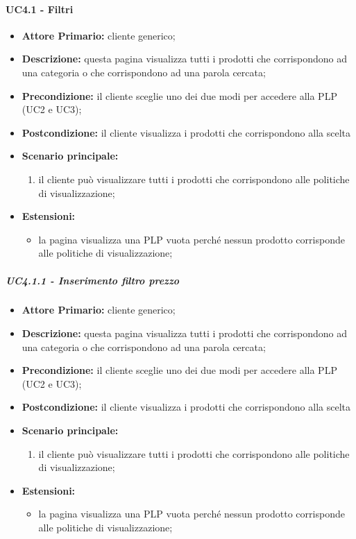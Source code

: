 \paragraph{UC4.1 - Filtri}
\begin{itemize}
    \item \textbf{Attore Primario:} cliente generico;
    \item \textbf{Descrizione:} questa pagina visualizza tutti i prodotti che corrispondono ad una categoria o che corrispondono ad una parola cercata;
    \item \textbf{Precondizione:} il cliente sceglie uno dei due modi per accedere alla PLP (UC2 e UC3);
    \item \textbf{Postcondizione:} il cliente visualizza i prodotti che corrispondono alla scelta
    \item \textbf{Scenario principale:}
    \begin{enumerate}
        \item il cliente può visualizzare tutti i prodotti che corrispondono alle politiche di visualizzazione;
    \end{enumerate}
    \item \textbf{Estensioni:}
    \begin{itemize}
        \item la pagina visualizza una PLP vuota perché nessun prodotto corrisponde alle politiche di visualizzazione;
    \end{itemize}
\end{itemize}

\subparagraph{UC4.1.1 - Inserimento filtro prezzo}
\begin{itemize}
    \item \textbf{Attore Primario:} cliente generico;
    \item \textbf{Descrizione:} questa pagina visualizza tutti i prodotti che corrispondono ad una categoria o che corrispondono ad una parola cercata;
    \item \textbf{Precondizione:} il cliente sceglie uno dei due modi per accedere alla PLP (UC2 e UC3);
    \item \textbf{Postcondizione:} il cliente visualizza i prodotti che corrispondono alla scelta
    \item \textbf{Scenario principale:}
    \begin{enumerate}
        \item il cliente può visualizzare tutti i prodotti che corrispondono alle politiche di visualizzazione;
    \end{enumerate}
    \item \textbf{Estensioni:}
    \begin{itemize}
        \item la pagina visualizza una PLP vuota perché nessun prodotto corrisponde alle politiche di visualizzazione;
    \end{itemize}
\end{itemize}

